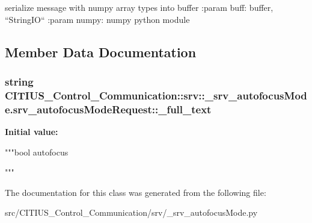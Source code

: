 \begin{DoxyVerb}
serialize message with numpy array types into buffer
:param buff: buffer, ``StringIO``
:param numpy: numpy python module
\end{DoxyVerb}
 

\subsection{\-Member \-Data \-Documentation}
\hypertarget{class_c_i_t_i_u_s___control___communication_1_1srv_1_1__srv__autofocus_mode_1_1srv__autofocus_mode_request_aeeb71a71b461b744ad6dc74eeea29c91}{
\subsubsection[{\-\_\-full\-\_\-text}]{\setlength{\rightskip}{0pt plus 5cm}string \-C\-I\-T\-I\-U\-S\-\_\-\-Control\-\_\-\-Communication\-::srv\-::\-\_\-srv\-\_\-autofocus\-Mode.\-srv\-\_\-autofocus\-Mode\-Request\-::\-\_\-full\-\_\-text}}\label{class_c_i_t_i_u_s___control___communication_1_1srv_1_1__srv__autofocus_mode_1_1srv__autofocus_mode_request_aeeb71a71b461b744ad6dc74eeea29c91}
{\bfseries \-Initial value\-:}
\begin{DoxyCode}
"""bool autofocus

"""
\end{DoxyCode}


\-The documentation for this class was generated from the following file\-:\begin{DoxyCompactItemize}
\item 
src/\-C\-I\-T\-I\-U\-S\-\_\-\-Control\-\_\-\-Communication/srv/\-\_\-srv\-\_\-autofocus\-Mode.\-py\end{DoxyCompactItemize}
